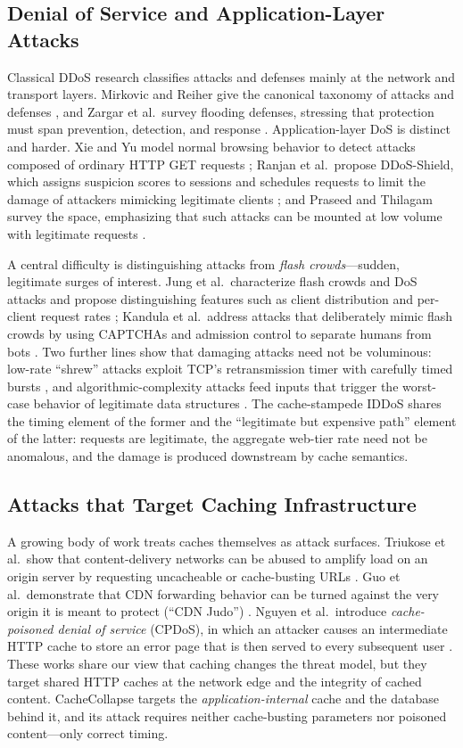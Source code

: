 \subsection{Denial of Service and Application-Layer Attacks}
Classical DDoS research classifies attacks and defenses mainly at the network and
transport layers. Mirkovic and Reiher give the canonical taxonomy of attacks and
defenses \cite{mirkovic2004}, and Zargar et al.\ survey flooding defenses, stressing
that protection must span prevention, detection, and response \cite{zargar2013}.
Application-layer DoS is distinct and harder. Xie and Yu model normal browsing behavior
to detect attacks composed of ordinary HTTP GET requests \cite{xie2009}; Ranjan et al.\
propose DDoS-Shield, which assigns suspicion scores to sessions and schedules requests
to limit the damage of attackers mimicking legitimate clients \cite{ranjan2009};
and Praseed and Thilagam survey the space, emphasizing that such attacks can be
mounted at low volume with legitimate requests \cite{praseed2019}.

A central difficulty is distinguishing attacks from \emph{flash crowds}---sudden,
legitimate surges of interest. Jung et al.\ characterize flash crowds and DoS attacks
and propose distinguishing features such as client distribution and per-client request
rates \cite{jung2002}; Kandula et al.\ address attacks that deliberately mimic flash
crowds by using CAPTCHAs and admission control to separate humans from bots
\cite{kandula2005}. Two further lines show that damaging attacks need not be
voluminous: low-rate ``shrew'' attacks exploit TCP's retransmission timer with
carefully timed bursts \cite{kuzmanovic2003}, and algorithmic-complexity attacks feed
inputs that trigger the worst-case behavior of legitimate data structures
\cite{crosby2003}. The cache-stampede IDDoS shares the timing element of the former and
the ``legitimate but expensive path'' element of the latter: requests are legitimate,
the aggregate web-tier rate need not be anomalous, and the damage is produced
downstream by cache semantics.

\subsection{Attacks that Target Caching Infrastructure}
A growing body of work treats caches themselves as attack surfaces. Triukose et al.\
show that content-delivery networks can be abused to amplify load on an origin server
by requesting uncacheable or cache-busting URLs \cite{triukose2009}. Guo et al.\
demonstrate that CDN forwarding behavior can be turned against the very origin it is
meant to protect (``CDN Judo'') \cite{guo2020}. Nguyen et al.\ introduce
\emph{cache-poisoned denial of service} (CPDoS), in which an attacker causes an
intermediate HTTP cache to store an error page that is then served to every subsequent
user \cite{nguyen2019}. These works share our view that caching changes the threat
model, but they target shared HTTP caches at the network edge and the integrity of
cached content. CacheCollapse targets the \emph{application-internal} cache and the
database behind it, and its attack requires neither cache-busting parameters nor
poisoned content---only correct timing.

